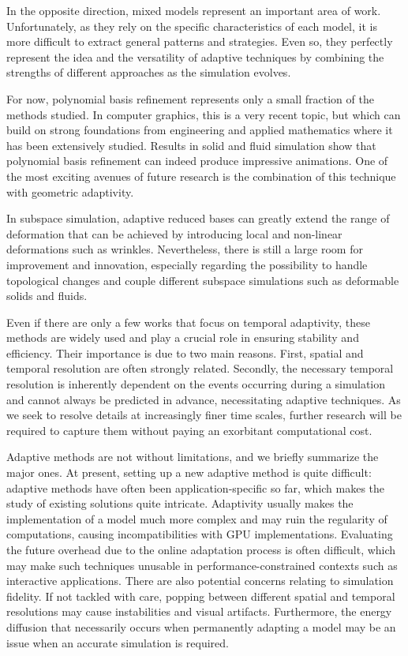 In the opposite direction, mixed models represent an important area of work.
Unfortunately, as they rely on the specific characteristics of each model, it is more difficult to extract general patterns and strategies. 
Even so, they perfectly represent the idea and the versatility of adaptive techniques by combining the strengths of different approaches as the simulation evolves.

For now, polynomial basis refinement represents only a small fraction of the methods studied. In computer graphics, this is a very recent topic, but which can build on strong foundations from engineering and applied mathematics where it has been extensively studied. Results in solid and fluid simulation show that polynomial basis refinement can indeed produce impressive animations. One of the most exciting avenues of future research is the combination of this technique with geometric adaptivity.

In subspace simulation, adaptive reduced bases can greatly extend the range of deformation that can be achieved by introducing local and non-linear deformations such as wrinkles. Nevertheless, there is still a large room for improvement and innovation, especially regarding the possibility to handle topological changes and couple different subspace simulations such as deformable solids and fluids.

Even if there are only a few works that focus on temporal adaptivity, these methods are widely used and play a crucial role in ensuring stability and efficiency. Their importance is due to two main reasons. First, spatial and temporal resolution are often strongly related. Secondly, the necessary temporal resolution is inherently dependent on the events occurring during a simulation and cannot always be predicted in advance, necessitating adaptive techniques. As we seek to resolve details at increasingly finer time scales, further research will be required to capture them without paying an exorbitant computational cost.

Adaptive methods are not without limitations, and we briefly summarize the major ones.
At present, setting up a new adaptive method is quite difficult: adaptive methods have often been application-specific so far, which makes the study of existing solutions quite intricate. Adaptivity usually makes the implementation of a model much more complex and may ruin the regularity of computations, causing incompatibilities with GPU implementations. Evaluating the future overhead due to the online adaptation process is often difficult, which may make such techniques unusable in performance-constrained contexts such as interactive applications.
There are also potential concerns relating to simulation fidelity. If not tackled with care, popping between different spatial and temporal resolutions may cause instabilities and visual artifacts. Furthermore, the energy diffusion that necessarily occurs when permanently adapting a model may be an issue when an accurate simulation is required.

